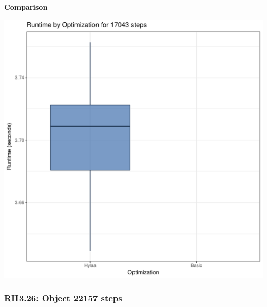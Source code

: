 \documentclass{article}\usepackage[]{graphicx}\usepackage[]{color}
\makeatletter
\def\maxwidth{ %
  \ifdim\Gin@nat@width>\linewidth
    \linewidth
  \else
    \Gin@nat@width
  \fi
}
\newenvironment{knitrout}{}{} %
\makeatother
\begin{document}
 \textbf{Comparison}
  
\begin{knitrout}
\color{fgcolor}
\includegraphics[width=\maxwidth]{figure/RH3_steps17043-1} 

\end{knitrout}


\subsubsection{RH3.26: Object 22157 steps}
\end{document}
